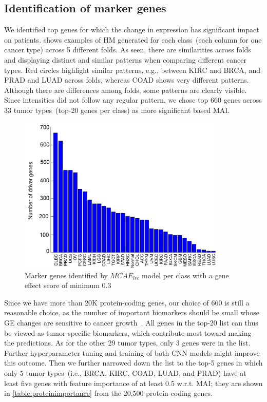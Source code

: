\subsection{Identification of marker genes}
We identified top genes for which the change in expression has significant impact on patients.  shows examples of HM generated for each class~(each column for one cancer type) across 5 different folds. As seen, there are similarities across folds and displaying distinct and similar patterns when comparing different cancer types. Red circles highlight similar patterns, e.g., between KIRC and BRCA, and PRAD and LUAD across folds, whereas COAD shows very different patterns. Although there are differences among folds, some patterns are clearly visible. Since intensities did not follow any regular pattern, we chose top 660 genes across 33 tumor types~(top-20 genes per class) as more significant based MAI. 

\begin{figure}
    \centering
	\includegraphics[width=0.7\linewidth,height=75mm]{images/driver_genes.png}
	\caption{Marker genes identified by $MCAE_{lrc}$ model per class with a gene effect score of minimum 0.3}
    \label{fig:dg_cnn}
\end{figure}

\hspace*{3.5mm} Since we have more than 20K protein-coding genes, our choice of 660 is still a reasonable choice, as the number of important biomarkers should be small whose GE changes are sensitive to cancer growth~\cite{zuo2019identification}. All genes in the top-20 list can thus be viewed as tumor-specific biomarkers, which contribute most toward making the predictions. As for the other 29 tumor types, only 3 genes were in the list. Further hyperparameter tuning and training of both CNN models might improve this outcome. Then we further narrowed down the list to the top-5 genes in which only 5 tumor types~(i.e., BRCA, KIRC, COAD, LUAD, and PRAD) have at least five genes with feature importance of at least 0.5 w.r.t. MAI; they are shown in \cref{table:proteinimportance} from the 20,500 protein-coding genes. 

